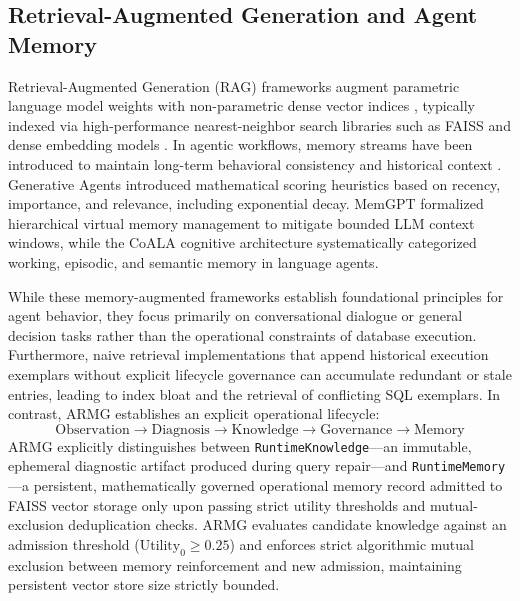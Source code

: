 \documentclass[conference]{IEEEtran}
\begin{document}
\subsection{Retrieval-Augmented Generation and Agent Memory}
Retrieval-Augmented Generation (RAG) frameworks augment parametric language model weights with non-parametric dense vector indices \cite{lewis2020rag}, typically indexed via high-performance nearest-neighbor search libraries such as FAISS \cite{johnson2021faiss} and dense embedding models \cite{nussbaum2024nomic}. In agentic workflows, memory streams have been introduced to maintain long-term behavioral consistency and historical context \cite{park2023generativeagents, packer2023memgpt, sumers2024coala}. Generative Agents \cite{park2023generativeagents} introduced mathematical scoring heuristics based on recency, importance, and relevance, including exponential decay. MemGPT \cite{packer2023memgpt} formalized hierarchical virtual memory management to mitigate bounded LLM context windows, while the CoALA cognitive architecture \cite{sumers2024coala} systematically categorized working, episodic, and semantic memory in language agents.

While these memory-augmented frameworks establish foundational principles for agent behavior, they focus primarily on conversational dialogue or general decision tasks rather than the operational constraints of database execution. Furthermore, naive retrieval implementations that append historical execution exemplars without explicit lifecycle governance can accumulate redundant or stale entries, leading to index bloat and the retrieval of conflicting SQL exemplars. In contrast, ARMG establishes an explicit operational lifecycle:
\begin{equation}
\text{Observation} \to \text{Diagnosis} \to \text{Knowledge} \to \text{Governance} \to \text{Memory}
\end{equation}
ARMG explicitly distinguishes between \texttt{RuntimeKnowledge}---an immutable, ephemeral diagnostic artifact produced during query repair---and \texttt{RuntimeMemory}---a persistent, mathematically governed operational memory record admitted to FAISS vector storage only upon passing strict utility thresholds and mutual-exclusion deduplication checks. ARMG evaluates candidate knowledge against an admission threshold ($\text{Utility}_0 \ge 0.25$) and enforces strict algorithmic mutual exclusion between memory reinforcement and new admission, maintaining persistent vector store size strictly bounded.
\end{document}

